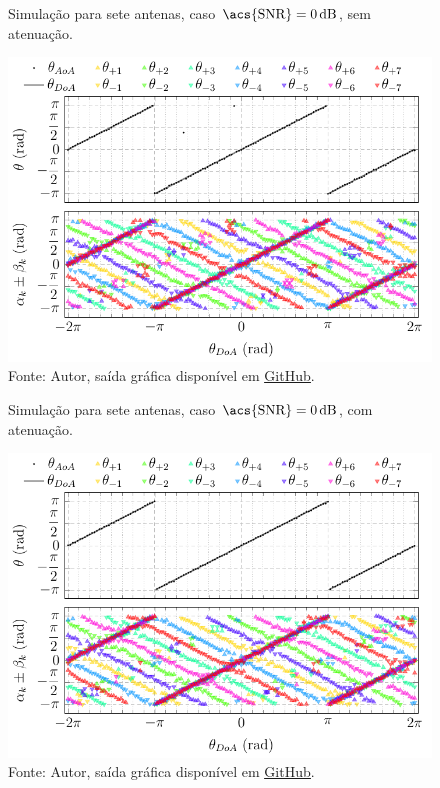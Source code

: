 \begin{figure}[H]
    \centering
    \caption{Simulação para sete antenas, caso $\text{\acs{SNR}} = \SI{0}{\deci\bel}$, sem atenuação.}
    \label{fig:simul_POLY_7_R_50_SNR_1}
    \includegraphics{../pictures/simul_POLY_7_R_50_SNR_1.pdf}
    \caption*{Fonte: Autor, saída gráfica disponível em \href{https://github.com/HeckRodSav/TG/blob/main/documentation/pictures/POLY_3/simul_POLY_7_R_50_SNR_1.gif}{\underline{GitHub}}.}
\end{figure}

\begin{figure}[H]
    \centering
    \caption{Simulação para sete antenas, caso $\text{\acs{SNR}} = \SI{0}{\deci\bel}$, com atenuação.}
    \label{fig:simul_POLY_7_R_50_SNR_1_ATT}
    \includegraphics{../pictures/simul_POLY_7_R_50_SNR_1_ATT.pdf}
    \caption*{Fonte: Autor, saída gráfica disponível em \href{https://github.com/HeckRodSav/TG/blob/main/documentation/pictures/POLY_3/simul_POLY_7_R_50_SNR_1_ATT.gif}{\underline{GitHub}}.}
\end{figure}

